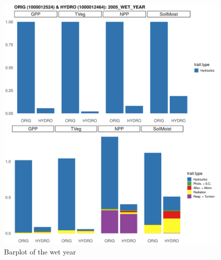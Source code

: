 
\begin{figure}[h]
    \centering
    \includegraphics[width=.3\textheight]{Hydro_Paper_LaTeX/Hydro_Paper_Figures/barplot_wet_year.png}
    \caption{Barplot of the wet year}
    \label{fig:barplot_wet}
\end{figure}